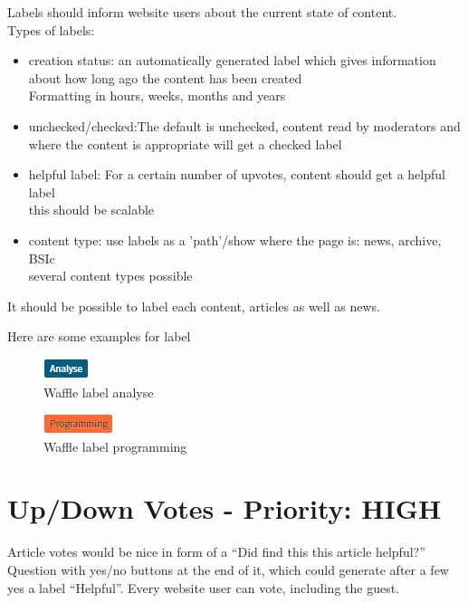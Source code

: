\begin{tcolorbox}[breakable,colback=red!14,colframe=red!40!black,title=UPDATE 30/11/2017]
Labels should inform website users about the current state of content. 
\\
Types of labels:
\begin{itemize}
    \item creation status: an automatically generated label which gives information about how long ago the content has been created\\
Formatting in hours, weeks, months and years
    \item unchecked/checked:The default is unchecked, content read by moderators and where the content is appropriate will get a checked label
    \item helpful label: For a certain number of upvotes, content should get a helpful label\\
this should be scalable
    \item content type: use labels as a 'path'/show where the page is: news, archive, BSIc\\
several content types possible
\end{itemize}

It should be possible to label each content, articles as well as news.


\end{tcolorbox}

Here are some examples for label
\begin{figure}[h] 
    \centering
    \includegraphics[scale=1.0]{Pictures/label1}
    \caption{Waffle label analyse}
\end{figure} 
\begin{figure}[h] 
    \centering
    \includegraphics[scale=1.0]{Pictures/label2}
    \caption{Waffle label programming}
\end{figure}

\section{Up/Down Votes - Priority: HIGH}
\begin{tcolorbox}[breakable,colback=red!14,colframe=red!40!black,title=UPDATE 30/11/2017]
Article votes would be nice in form of a “Did find this this article helpful?” Question with yes/no buttons at the end of it, which could generate after a few yes a label “Helpful”.
Every website user can vote, including the guest.
\end{tcolorbox}

